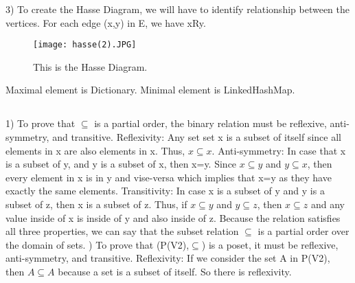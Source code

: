 \documentclass{article}
\begin{document}
3) 
To create the Hasse Diagram, we will have to identify relationship between the vertices. For each edge (x,y) in E, we have xRy. 
\newline \newline
\begin{figure}[h]
    \centering
    \texttt{[image: hasse(2).JPG]}
    \caption{This is the Hasse Diagram.}
    \label{fig:example}
\end{figure}\newline
\newline\newline
Maximal element is Dictionary.
\newline
Minimal element is LinkedHashMap.
\subsection{}
1)
To prove that $ \subseteq $ is a partial order, the binary relation must be reflexive, anti-symmetry, and transitive. 
\newline \newline
Reflexivity: 
Any set set x is a subset of itself since all elements in x are also elements in x. Thus, $x \subseteq x$.
\newline \newline
Anti-symmetry: 
In case that x is a subset of y, and y is a subset of x, then x=y. Since $x \subseteq y$ and $y \subseteq x$, then every element in x is in y and vise-versa which implies that x=y as they have exactly the same elements. 
\newline \newline
Transitivity: 
In case x is a subset of y and y is a subset of z, then x is a subset of z. Thus, if $x \subseteq y$ and $y \subseteq z$, then $x \subseteq z$ and any value inside of x is inside of y and also inside of z. 
\newline \newline
Because the relation satisfies all three properties, we can say that the subset relation $ \subseteq $  is a partial order over the domain of sets.
\newline {})
To prove that (P(V2),$ \subseteq $) is a poset, it must be reflexive, anti-symmetry, and transitive. 
\newline \newline
Reflexivity: 
If we consider the set A in P(V2), then $A \subseteq A$ because a set is a subset of itself. So there is reflexivity.
\newline \newline
\end{document}
